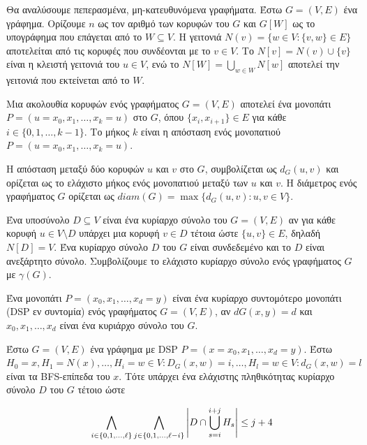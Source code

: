 Θα αναλύσουμε πεπερασμένα, μη-κατευθυνόμενα γραφήματα. Έστω $G = (V, E)$ ένα γράφημα. Ορίζουμε \( n \) ως τον αριθμό των κορυφών του \( G \) και \( G[W] \) ως το υπογράφημα που επάγεται από το \( W \subseteq V \). Η γειτονιά \( N(v) = \{w  \in V : \{v,w\} \in E\} \) αποτελείται από τις κορυφές που συνδέονται με το \( v \in V \). Το \( N[v] = N(v) \cup \{v\} \) είναι η κλειστή γειτονιά του \( u \in V \), ενώ το \( N[W] = \bigcup_{w \in W} N[w] \) αποτελεί την γειτονιά που εκτείνεται από το \( W \).

Μια ακολουθία κορυφών ενός γραφήματος \( G=(V, E) \) αποτελεί ένα μονοπάτι \( P=(u=x_0,x_1,\dots, x_k =u) \) στο \( G \), όπου \( \{x_i, x_{i+1}\} \in E \) για κάθε \( i \in \{0, 1, \dots,k-1\} \). Το μήκος \( k \) είναι η απόσταση ενός μονοπατιού \( P =(u=x_0, x_1, \dots, x_k=u) \).

Η απόσταση μεταξύ δύο κορυφών \( u \) και \( v \) στο \( G \), συμβολίζεται ως \( d_G (u,v) \) και ορίζεται ως το ελάχιστο μήκος ενός μονοπατιού μεταξύ των \( u \) και \( v \). Η διάμετρος ενός γραφήματος \( G \) ορίζεται ως \( diam(G) = \max \{d_G(u,v): u,v \in V \} \).

Ένα υποσύνολο \( D \subseteq V \) είναι ένα κυρίαρχο σύνολο του \( G = (V,E) \) αν για κάθε κορυφή \( u \in V \setminus D \) υπάρχει μια κορυφή \( v \in D \) τέτοια ώστε \( \{u, v\} \in E \), δηλαδή \( N[D] = V \). Ένα κυρίαρχο σύνολο \( D \) του \( G \) είναι συνδεδεμένο και το \( D \) είναι ανεξάρτητο σύνολο. Συμβολίζουμε το ελάχιστο κυρίαρχο σύνολο ενός γραφήματος \( G \) με \( \gamma(G) \).

\begin{definition}
	Ένα μονοπάτι $P = (x_0, x_1,\dots , x_d =y)$ είναι ένα κυρίαρχο συντομότερο μονοπάτι (DSP εν συντομία) ενός γραφήματος $G=(V,E)$, αν $dG(x,y) = d$ και ${x_0, x_1, \dots , x_d}$ είναι ένα κυριάρχο σύνολο του $G$.
\end{definition}

\begin{theorem}
	\label{domination-set-dsp-theorem}
	Έστω $G = (V,E)$ ένα γράφημα με DSP $P =(x=x_0,x_1, \dots , x_d=y)$.  Έστω $H_0 ={x},H_1 = N(x),\dots ,H_i = {w \in V: D_G(x,w) = i}, \dots,H_l = {w \in V: d_G(x,w)=l}$
	είναι τα BFS-επίπεδα του $x$. Τότε υπάρχει ένα ελάχιστης πληθικότητας κυρίαρχο σύνολο $D$ του $G$ τέτοιο ώστε
\end{theorem}

\begin{center}
	\[
	\displaystyle \LARGE  \bigwedge_{i\in\{0,1,\ldots,\ell\}} \bigwedge_{j\in\{0,1,\ldots,\ell-i\}} \left|D\cap\bigcup_{s=i}^{i+j}H_{s}\right| \leq j+4
	\]
\end{center}

